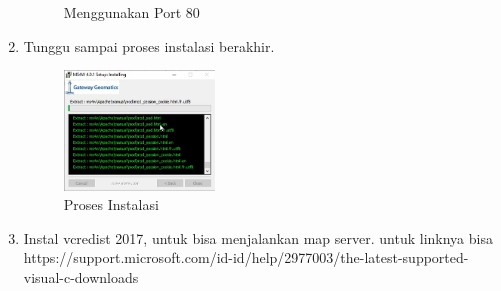 \begin{enumerate}
\begin{figure}[H]
		\centering
		\caption{Menggunakan Port 80}
    \end{figure}
    \item Tunggu sampai proses instalasi berakhir.
    \begin{figure}[H]
		\includegraphics[width=4cm]{figures/tugas4/1174054/8.png}
		\centering
		\caption{Proses Instalasi}
    \end{figure}
    \item Instal vcredist 2017, untuk bisa menjalankan map server. untuk linknya bisa https://support.microsoft.com/id-id/help/2977003/the-latest-supported-visual-c-downloads
\end{enumerate}
